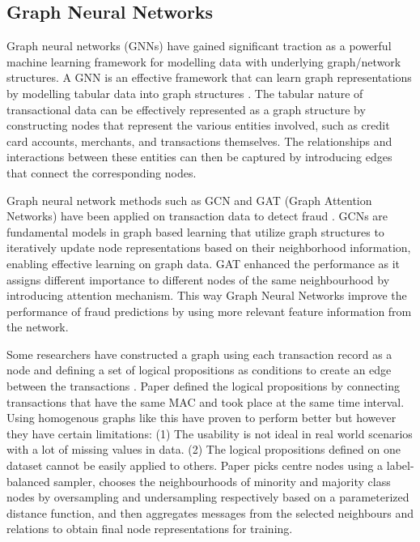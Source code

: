 \documentclass[pdflatex,sn-mathphys-num]{sn-jnl}%
\begin{document}
\subsection{Graph Neural Networks}\label{subsec2}

Graph neural networks (GNNs) have gained significant traction as a powerful machine learning framework for modelling data with underlying graph/network structures. A GNN is an effective framework that can learn graph representations by modelling tabular data into graph structures \cite{li2024}. The tabular nature of transactional data can be effectively represented as a graph structure by constructing nodes that represent the various entities involved, such as credit card accounts, merchants, and transactions themselves. The relationships and interactions between these entities can then be captured by introducing edges that connect the corresponding nodes. 

Graph neural network methods such as GCN and GAT (Graph Attention Networks) have been applied on transaction data to detect fraud \cite{taing2022}. GCNs are fundamental models in graph based learning that utilize graph structures to iteratively update node representations based on their neighborhood information, enabling effective learning on graph data. GAT enhanced the performance as it assigns different importance to different nodes of the same neighbourhood by introducing attention mechanism. This way Graph Neural Networks improve the performance of fraud predictions by using more relevant feature information from the network.

Some researchers have constructed a graph using each transaction record as a node and defining a set of logical propositions as conditions to create an edge between the transactions \cite{liu2021-2} \cite{tian2023}. Paper \cite{liu2021-2} defined the logical propositions by connecting transactions that have the same MAC and took place at the same time interval. Using homogenous graphs like this have proven to perform better \cite{taing2022} but however they have certain limitations: (1) The usability is not ideal in real world scenarios with a lot of missing values in data. (2) The logical propositions defined on one dataset cannot be easily applied to others. Paper \cite{liu2021-3} picks centre nodes using a label-balanced sampler, chooses the neighbourhoods of minority and majority class nodes by oversampling and undersampling respectively based on a parameterized distance function, and then aggregates messages from the selected neighbours and relations to obtain final node representations for training.
\end{document}
